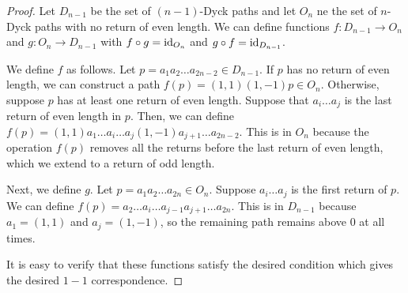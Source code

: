 \documentclass[11pt]{scrartcl}
\newcommand{\<}{\langle}
\renewcommand{\>}{\rangle}
\begin{document}
\begin{proof}
Let $D_{n-1}$ be the set of $(n-1)$-Dyck paths and let $O_{n}$ ne the set of $n$-Dyck paths with no return of even length.  We can define functions $f: D_{n-1} \to O_n$ and $g: O_n \to D_{n-1}$ with $f \circ g = \mathrm{id}_{O_n}$ and $g \circ f = \mathrm{id}_{D_{n-1}}$.

We define $f$ as follows.  Let $p = a_1a_2\dots a_{2n-2} \in D_{n-1}$.  If $p$ has no return of even length, we can construct a path $f(p) = (1, 1)(1, -1)p \in O_n$.  Otherwise, suppose $p$ has at least one return of even length.  Suppose that $a_i \dots a_j$ is the last return of even length in $p$.  Then, we can define $f(p) = (1, 1) a_1 \dots a_i \dots a_j (1, -1) a_{j+1} \dots a_{2n-2}$.  This is in $O_n$ because the operation $f(p)$ removes all the returns before the last return of even length, which we extend to a return of odd length.  

Next, we define $g$.  Let $p = a_1a_2\dots a_{2n} \in O_n$.  Suppose $a_i \dots a_j$ is the first return of $p$.  We can define $f(p) = a_2 \dots a_i \dots a_{j-1} a_{j+1} \dots a_{2n}$.  This is in $D_{n-1}$ because $a_1 = (1, 1)$ and $a_j = (1, -1)$, so the remaining path remains above $0$ at all times.  

It is easy to verify that these functions satisfy the desired condition which gives the desired $1-1$ correspondence.  
\end{proof}
\pagebreak
\end{document}
